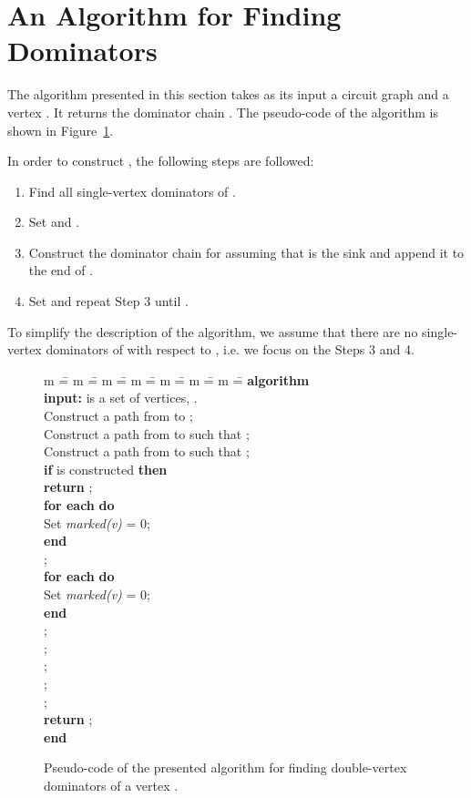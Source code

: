 \documentclass{llncs}
\newcommand{\ALGORITHM}{\textbf{algorithm} }
\newcommand{\END}{\textbf{end} }
\newcommand{\DO}{\textbf{do} }
\newcommand{\FOREACH}{\textbf{for each} }
\newcommand{\IF}{\textbf{if} }
\newcommand{\RETURN}{\textbf{return} }
\newcommand{\THEN}{\textbf{then} }
\newcommand{\INPUT}{\textbf{input:} }
\begin{document}
\section{An Algorithm for Finding Dominators} \label{ddom_alg}

The algorithm presented in this section
takes as its input a circuit graph  and a
vertex .  It returns the dominator chain .
The pseudo-code of the algorithm is shown in Figure~\ref{ddom_code_d}.

In order to construct , the following steps are followed:
\begin{enumerate}
\item Find all single-vertex dominators of .
\item Set  and .
\item Construct the dominator chain   for  assuming that  is the sink
and append it to the end of .
\item Set  and repeat Step 3 until .
\end{enumerate}

To simplify the description of the algorithm, we assume that there are
no single-vertex dominators of  with respect to , i.e.
we focus on the Steps 3 and 4. 





\begin{figure}[t!] 
\begin{center}
\parbox{0cm} 
{
\begin{tabbing}  
m \== m \== m \== m \== m \== m \== m \== \kill
\ALGORITHM  \\
\INPUT  is a set of vertices, .\\
\> Construct a path  from  to ;\\
\> Construct a path  from  to  such that ; \\
\> Construct a path  from  to  such that ; \\
\> \IF  is constructed \THEN \\
\> \> \RETURN ; \\ \> \FOREACH  \DO \\
\> \> Set {\em marked(v)} = 0;\\
\> \END \\
\> ;\\
\> \FOREACH   \DO \\
\> \> Set {\em marked(v)} = 0;\\
\> \END \\
\> ;\\
\> ;\\
\> ;\\
\> ;\\
\> ;\\
\> \RETURN ;\\
\END
\end{tabbing}
}
\caption{Pseudo-code of the presented algorithm for finding double-vertex dominators of a vertex .}\label{ddom_code_d}
\end{center}
\end{figure}
\end{document}
